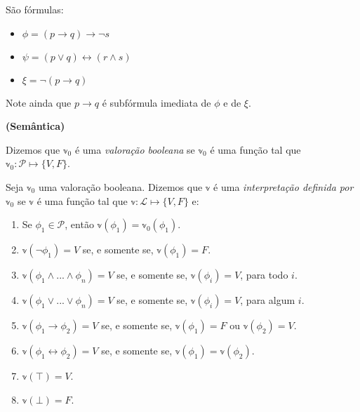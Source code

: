 \begin{example}
	São fórmulas:
	\begin{itemize}
		\item $\phi = (p \rightarrow q) \rightarrow \neg s$
		\item $\psi = (p \vee q) \leftrightarrow (r \wedge s)$
		\item $\xi  = \neg(p \rightarrow q)$
	\end{itemize}
	
	Note ainda que $p \rightarrow q$ é subfórmula imediata de $\phi$ e de $\xi$.
\end{example}

\begin{definition}\textbf{(Semântica)}
	
	Dizemos que $\mathbb{v}_0$ é uma \emph{valoração booleana} se $\mathbb{v}_0$ é uma função tal que\break $\mathbb{v}_0 : \mathcal{P} \longmapsto \{V,F\}$.
    
    Seja $\mathbb{v}_0$ uma valoração booleana. Dizemos que $\mathbb{v}$ é uma \emph{interpretação definida por $\mathbb{v}_0$} se $\mathbb{v}$ é uma função tal que $\mathbb{v} : \mathcal{L} \longmapsto \{V,F\}$ e:
    \begin{enumerate}
        \item Se $\phi_1 \in \mathcal{P}$, então $\mathbb{v}(\phi_1) = \mathbb{v}_0(\phi_1)$.
        \item $\mathbb{v}(\neg \phi_1) = V$ se, e somente se, $\mathbb{v}(\phi_1) = F$.
        \item $\mathbb{v}(\phi_1 \wedge ... \wedge \phi_n) = V$ se, e somente se, $\mathbb{v}(\phi_i) = V$, para todo $i$.
        \item $\mathbb{v}(\phi_1 \vee ... \vee \phi_n) = V$ se, e somente se, $\mathbb{v}(\phi_i) = V$, para algum $i$.
        \item $\mathbb{v}(\phi_1 \rightarrow \phi_2) = V$ se, e somente se, $\mathbb{v}(\phi_1) = F$ ou $\mathbb{v}(\phi_2) = V$.
        \item $\mathbb{v}(\phi_1 \leftrightarrow \phi_2) = V$ se, e somente se, $\mathbb{v}(\phi_1) = \mathbb{v}(\phi_2)$.
        \item $\mathbb{v}(\top) = V$.
        \item $\mathbb{v}(\bot) = F$.
    \end{enumerate}
\end{definition}


